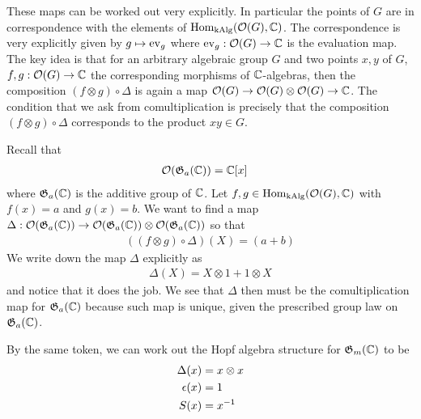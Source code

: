 \documentclass[12pt]{article}
\begin{document}
\begin{remark}
    These maps can be worked out very explicitly. In particular the points of $G$ are in correspondence with the elements of $\operatorname{Hom}_{\operatorname{kAlg}}({\mathcal{O}}(G),\mathbb{C})$.
    The correspondence is very explicitly given by $g\mapsto \operatorname{ev}_g$ where $\operatorname{ev}_g: {\mathcal{O}}(G)\to \mathbb{C}$ is the evaluation map. 
    The key idea is that for an arbitrary algebraic group $G$ and two points $x,y$ of $G$,
     $f,g: {\mathcal{O}}(G)\to \mathbb{C}$ the corresponding morphisms of $\mathbb{C}$-algebras, then the composition $(f\otimes g)\circ \Delta$ is again a map ${\mathcal{O}}(G)\to {\mathcal{O}}(G)\otimes {\mathcal{O}}(G)\to \mathbb{C}$.
    The condition that we ask from comultiplication is precisely that the composition $(f\otimes g)\circ \Delta$
    corresponds to the product $xy\in G$.
\end{remark}

\begin{example}
Recall that
    \begin{align*}
        {\mathcal{O}}(\mathfrak{G}_a(\mathbb{C})) &= \mathbb{C}[x]
    \end{align*} where $\mathfrak{G}_a(\mathbb{C})$ is the additive group of $\mathbb{C}$. 
    Let $f,g\in \operatorname{Hom}_{\operatorname{kAlg}}({\mathcal{O}}(G),\mathbb{C})$ with $f(x) = a$ and $g(x) = b$. 
    We want to find a map $\Delta: {\mathcal{O}}(\mathfrak{G}_a(\mathbb{C}))\to {\mathcal{O}}(\mathfrak{G}_a(\mathbb{C}))\otimes {\mathcal{O}}(\mathfrak{G}_a(\mathbb{C}))$ so that
    \begin{align*}
        ((f\otimes g)\circ \Delta)(X) = (a+b)
    \end{align*}
    We write down the map $\Delta$ explicitly as
    \begin{align*}
        \Delta(X) = X\otimes 1 + 1\otimes X
    \end{align*} and notice that it does the job. We see that $\Delta$ then must be the 
    comultiplication map for $\mathfrak{G}_a(\mathbb{C})$ because such map is unique, given the prescribed group law on $\mathfrak{G}_a(\mathbb{C})$.
\end{example}

\begin{example}
    By the same token, we can work out the Hopf algebra structure for $\mathfrak{G}_m(\mathbb{C})$ to be
    \begin{align*}
        \Delta(x) &= x\otimes x \\
        \epsilon(x) &= 1 \\
        S(x) &= {x}^{-1}
    \end{align*}
\end{example}
\end{document}
